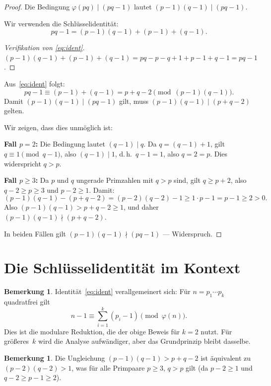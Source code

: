 \documentclass[12pt,a4paper]{amsart}
\theoremstyle{definition}
\newtheorem{remark}[theorem]{Bemerkung}
\newcommand{\euler}{\varphi}
\begin{document}
\begin{proof}
Die Bedingung $\euler(pq) \mid (pq - 1)$ lautet $(p-1)(q-1) \mid (pq - 1)$.

Wir verwenden die Schlüsselidentität:
\begin{equation}
  pq - 1 = (p-1)(q-1) + (p-1) + (q-1).
  \label{eq:ident}
\end{equation}

\begin{proof}[Verifikation von \eqref{eq:ident}]
$(p-1)(q-1) + (p-1) + (q-1) = pq - p - q + 1 + p - 1 + q - 1 = pq - 1$. \checkmark
\end{proof}

Aus~\eqref{eq:ident} folgt:
\[
  pq - 1 \equiv (p-1) + (q-1) = p + q - 2 \pmod{(p-1)(q-1)}.
\]
Damit $(p-1)(q-1) \mid (pq-1)$ gilt, muss $(p-1)(q-1) \mid (p + q - 2)$ gelten.

Wir zeigen, dass dies unmöglich ist:

\textbf{Fall $p = 2$:} Die Bedingung lautet $(q-1) \mid q$.
Da $q = (q-1)+1$, gilt $q \equiv 1 \pmod{q-1}$, also $(q-1) \mid 1$,
d.\,h.\ $q-1 = 1$, also $q = 2 = p$.
Dies widerspricht $q > p$.

\textbf{Fall $p \ge 3$:} Da $p$ und $q$ ungerade Primzahlen mit $q > p$ sind,
gilt $q \ge p + 2$, also $q - 2 \ge p \ge 3$ und $p - 2 \ge 1$. Damit:
\[
  (p-1)(q-1) - (p+q-2) = (p-2)(q-2) - 1 \ge 1 \cdot p - 1 = p - 1 \ge 2 > 0.
\]
Also $(p-1)(q-1) > p + q - 2 \ge 1$, und daher $(p-1)(q-1) \nmid (p+q-2)$.

In beiden Fällen gilt $(p-1)(q-1) \nmid (pq-1)$ — Widerspruch.
\end{proof}

\section{Die Schlüsselidentität im Kontext}

\begin{remark}
Identität~\eqref{eq:ident} verallgemeinert sich: Für $n = p_1 \cdots p_k$ quadratfrei gilt
\[
  n - 1 \equiv \sum_{i=1}^{k}(p_i - 1) \pmod{\euler(n)}.
\]
Dies ist die modulare Reduktion, die der obige Beweis für $k = 2$ nutzt.
Für größeres~$k$ wird die Analyse aufwändiger, aber das Grundprinzip bleibt dasselbe.
\end{remark}

\begin{remark}
Die Ungleichung $(p-1)(q-1) > p + q - 2$ ist äquivalent zu $(p-2)(q-2) > 1$,
was für alle Primpaare $p \ge 3$, $q > p$ gilt (da $p - 2 \ge 1$ und $q - 2 \ge p - 1 \ge 2$).
\end{remark}
\end{document}

